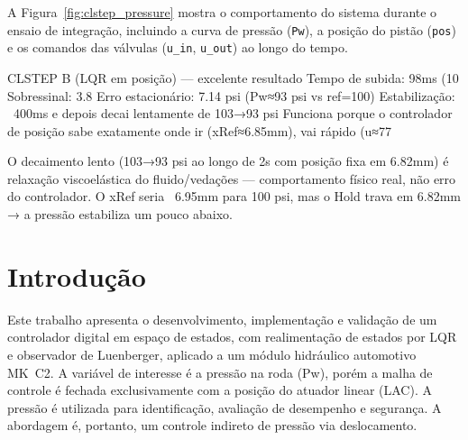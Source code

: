 A Figura~\ref{fig:clstep_pressure} mostra o comportamento do sistema durante o ensaio de integração, incluindo a curva de pressão (\texttt{Pw}), a posição do pistão (\texttt{pos}) e os comandos das válvulas (\texttt{u\_in}, \texttt{u\_out}) ao longo do tempo.

CLSTEP B (LQR em posição) — excelente resultado
Tempo de subida: 98ms (10%
Sobressinal: 3.8%
Erro estacionário: 7.14 psi (Pw≈93 psi vs ref=100)
Estabilização: ~400ms e depois decai lentamente de 103→93 psi
Funciona porque o controlador de posição sabe exatamente onde ir (xRef≈6.85mm), vai rápido (u≈77%

O decaimento lento (103→93 psi ao longo de 2s com posição fixa em 6.82mm) é relaxação viscoelástica do fluido/vedações — comportamento físico real, não erro do controlador. O xRef seria ~6.95mm para 100 psi, mas o Hold trava em 6.82mm → a pressão estabiliza um pouco abaixo.

\section{Introdução}
Este trabalho apresenta o desenvolvimento, implementação e validação de um controlador digital em espaço de estados, com realimentação de estados por LQR e observador de Luenberger, aplicado a um módulo hidráulico automotivo MK~C2. A variável de interesse é a pressão na roda (Pw), porém a malha de controle é fechada exclusivamente com a posição do atuador linear (LAC). A pressão é utilizada para identificação, avaliação de desempenho e segurança. A abordagem é, portanto, um controle indireto de pressão via deslocamento.

